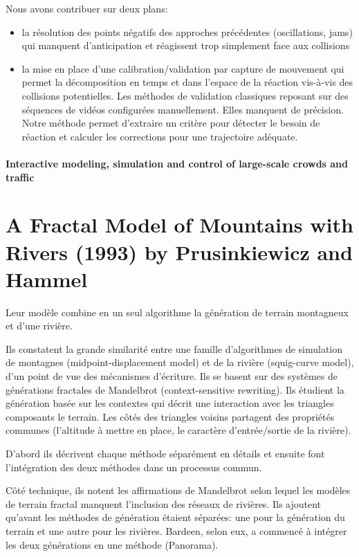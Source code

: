 \documentclass[11pt]{report}
\begin{document}
Nous avons contribuer sur deux plans:
\begin{itemize}
\item la résolution des points négatifs des approches précédentes (oscillations, jams) qui manquent d'anticipation et réagissent trop simplement face aux collisions
\item la mise en place d'une calibration/validation par capture de mouvement qui permet la décomposition en temps et dans l'espace de la réaction vis-à-vis des collisions potentielles. Les méthodes de validation classiques reposant sur des séquences de vidéos configurées manuellement. Elles manquent de précision. Notre méthode permet d'extraire un critère pour détecter le besoin de réaction et calculer les corrections pour une trajectoire adéquate.
\end{itemize}



\subsection{Interactive modeling, simulation and control of large-scale crowds and traffic}\label{Ming_Interactive}


\part{A Fractal Model of Mountains with Rivers (1993) by Prusinkiewicz and Hammel}

Leur modèle combine en un seul algorithme la génération de terrain montagneux et d'une rivière.

Ils constatent la grande similarité entre une famille d'algorithmes de simulation de montagnes (midpoint-displacement model) et de la rivière (squig-curve model), d'un point de vue des mécanismes d'écriture. Ils se basent sur des systèmes de générations fractales de Mandelbrot (context-sensitive rewriting). Ils étudient la génération basée sur les contextes qui décrit une interaction avec les triangles composants le terrain. Les côtés des triangles voisins partagent des propriétés communes (l'altitude à mettre en place, le caractère d'entrée/sortie de la rivière). 

D'abord ils décrivent chaque méthode séparément en détails et ensuite font l'intégration des deux méthodes dans un processus commun.

Côté technique, ils notent les affirmations de Mandelbrot selon lequel les modèles de terrain fractal manquent l'inclusion des réseaux de rivières.
Ils ajoutent qu'avant les méthodes de génération étaient séparées: une pour la génération du terrain et une autre pour les rivières. Bardeen, selon eux, a commencé à intégrer les deux générations en une méthode (Panorama).
\end{document}
